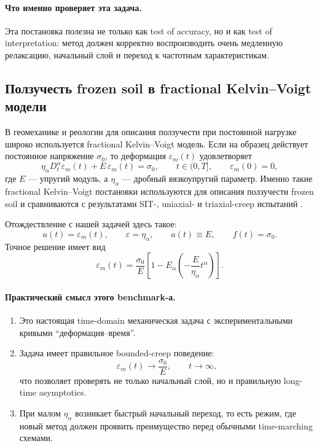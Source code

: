 \documentclass[12pt,a4paper]{article}
\theoremstyle{definition}
\newcommand{\eps}{\varepsilon}
\begin{document}
\paragraph{Что именно проверяет эта задача.}
Эта постановка полезна не только как test of accuracy, но и как test of interpretation:
метод должен корректно воспроизводить очень медленную релаксацию,
начальный слой и переход к частотным характеристикам.

\subsection{Ползучесть frozen soil в fractional Kelvin--Voigt модели}
\label{app:frozen-soil}

В геомеханике и реологии для описания ползучести при постоянной нагрузке
широко используется fractional Kelvin--Voigt модель.
Если на образец действует постоянное напряжение $\sigma_0$, то деформация
$\varepsilon_m(t)$ удовлетворяет
\begin{equation}
\label{eq:app-creep}
\eta_\alpha D_t^\alpha \varepsilon_m(t)+E\,\varepsilon_m(t)=\sigma_0,
\qquad
t\in(0,T],
\qquad
\varepsilon_m(0)=0,
\end{equation}
где $E$ --- упругий модуль, а $\eta_\alpha$ --- дробный вязкоупругий параметр.
Именно такие fractional Kelvin--Voigt постановки используются для описания
ползучести frozen soil и сравниваются с результатами SIT-, uniaxial- и triaxial-creep
испытаний \cite{zhang2022frozen}.

Отождествление с нашей задачей здесь такое:
\[
u(t)=\varepsilon_m(t),
\qquad
\eps=\eta_\alpha,
\qquad
a(t)\equiv E,
\qquad
f(t)=\sigma_0.
\]
Точное решение имеет вид
\begin{equation}
\label{eq:app-creep-exact}
\varepsilon_m(t)
=
\frac{\sigma_0}{E}
\left[
1-
E_\alpha\!\left(-\frac{E}{\eta_\alpha}t^\alpha\right)
\right].
\end{equation}

\paragraph{Практический смысл этого benchmark-а.}
\begin{enumerate}[label=\textup{(\roman*)}]
\item Это настоящая time-domain механическая задача с экспериментальными кривыми
``деформация--время''.
\item Задача имеет правильное bounded-creep поведение:
\[
\varepsilon_m(t)\to \frac{\sigma_0}{E}, \qquad t\to\infty,
\]
что позволяет проверять не только начальный слой, но и правильную long-time asymptotics.
\item При малом $\eta_\alpha$ возникает быстрый начальный переход, то есть режим,
где новый метод должен проявить преимущество перед обычными time-marching схемами.
\end{enumerate}
\end{document}
